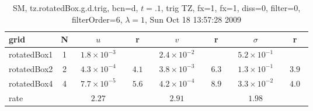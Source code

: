 \begin{table}[hbt]\tableFont %
\begin{center}
\begin{tabular}{|l|c|c|c|c|c|c|c|} \hline 
grid  & N &  $u$  & r &  $v$  & r &  $\sigma$   & r \\ \hline 
         rotatedBox1 &     1 & ~$1.8\times10^{ -3}$~ &           & ~$2.4\times10^{ -2}$~ &           & ~$5.2\times10^{ -1}$~ &            \\ \hline
         rotatedBox2 &     2 & ~$4.3\times10^{ -4}$~ & ~$  4.1$~ & ~$3.8\times10^{ -3}$~ & ~$  6.3$~ & ~$1.3\times10^{ -1}$~ & ~$  3.9$~  \\ \hline
         rotatedBox4 &     4 & ~$7.7\times10^{ -5}$~ & ~$  5.6$~ & ~$4.2\times10^{ -4}$~ & ~$  8.9$~ & ~$3.3\times10^{ -2}$~ & ~$  4.0$~  \\ \hline
    rate             &       &       $2.27$         &       &       $2.91$         &       &       $1.98$         &        \\ \hline
\end{tabular}
\caption{SM, tz.rotatedBox.g.d.trig, bcn=d, $t=.1$, trig TZ, fx=1, fx=1, diss=0, filter=0, filterOrder=6, $\lambda=1$,  Sun Oct 18 13:57:28 2009}\label{table:tz.rotatedBox.g.d.trig}
\end{center}
\end{table}
